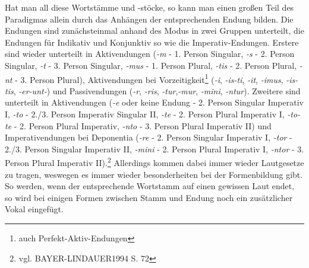 \documentclass[12pt,abstract=on]{scrreprt}
\begin{document}
Hat man all diese Wortstämme und -stöcke, so kann man einen großen Teil des Paradigmas allein durch das Anhängen der entsprechenden Endung bilden. Die Endungen sind zunächsteinmal anhand des Modus in zwei Gruppen unterteilt, die Endungen für Indikativ und Konjunktiv so wie die Imperativ-Endungen. Erstere sind wieder unterteilt in Aktivendungen (\textit{-m} - 1. Person Singular, \textit{-s} - 2. Person Singular, \textit{-t} - 3. Person Singular, \textit{-mus} - 1. Person Plural, \textit{-tis} - 2. Person Plural, \textit{-nt} - 3. Person Plural), Aktivendungen bei Vorzeitigkeit\footnote{auch Perfekt-Aktiv-Endungen} (\textit{-i}, \textit{-is-ti}, \textit{-it}, \textit{-imus}, \textit{-is-tis}, \textit{-er-unt-}) und Passivendungen (\textit{-r}, \textit{-ris}, \textit{-tur},\textit{-mur}, \textit{-mini}, \textit{-ntur}). Zweitere sind unterteilt in Aktivendungen (\textit{-e} oder keine Endung - 2. Person Singular Imperativ I, \textit{-to} - 2./3. Person Imperativ Singular II, \textit{-te} - 2. Person Plural Imperativ I, \textit{-to-te} - 2. Person Plural Imperativ, \textit{-nto} - 3. Person Plural Imperativ II) und Imperativendungen bei Deponentia (\textit{-re} - 2. Person Singular Imperativ I, \textit{-tor} - 2./3. Person Singular Imperativ II, \textit{-mini} - 2. Person Plural Imperativ I, \textit{-ntor} - 3. Person Plural Imperativ II).\footnote{vgl. BAYER-LINDAUER1994 S. 72} Allerdings kommen dabei immer wieder Lautgesetze zu tragen, weswegen es immer wieder besonderheiten bei der Formenbildung gibt. So werden, wenn der entsprechende Wortstamm auf einen gewissen Laut endet, so wird bei einigen Formen zwischen Stamm und Endung noch ein zusätzlicher Vokal eingefügt. \par
\end{document}

